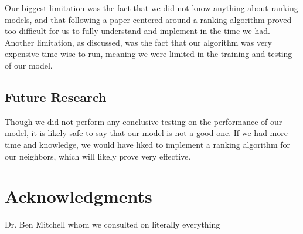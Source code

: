 \documentclass{article}
\begin{document}
Our biggest limitation was the fact that we did not know anything about ranking models, and that following a paper centered around a ranking algorithm proved too difficult for us to fully understand and implement in the time we had. Another limitation, as discussed, was the fact that our algorithm was very expensive time-wise to run, meaning we were limited in the training and testing of our model.

\subsection{Future Research}

Though we did not perform any conclusive testing on the performance of our model, it is likely safe to say that our model is not a good one. If we had more time and knowledge, we would have liked to implement a ranking algorithm for our neighbors, which will likely prove very effective. 

\section*{Acknowledgments}

Dr. Ben Mitchell whom we consulted on literally everything 




\end{document}
